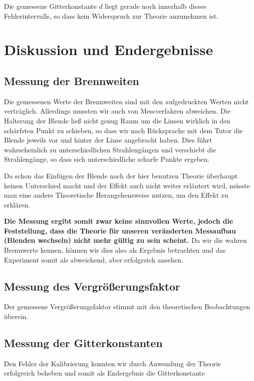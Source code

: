 \documentclass[a4paper,german,12pt,smallheadings]{scrartcl}
\begin{document}
Die gemessene Gitterkonstante $d$ liegt gerade noch innerhalb dieses
Fehlerintervalls, so dass kein Widerspruch zur Theorie anzunehmen ist.

\section{Diskussion und Endergebnisse}

\subsection{Messung der Brennweiten}

Die gemessenen Werte der Brennweiten sind mit den aufgedruckten Werten nicht
verträglich.  Allerdings mussten wir auch von Messverfahren abweichen. Die
Halterung der Blende ließ nicht genug Raum um die Linsen wirklich in den
schärfsten Punkt zu schieben, so dass wir nach Rücksprache mit dem Tutor die
Blende jeweils vor und hinter der Linse angebracht haben. Dies führt
wahrscheinlich zu unterschiedlichen Strahlengängen und verschiebt die
Strahlengänge, so dass sich unterschiedliche scharfe Punkte ergeben.

Da schon das Einfügen der Blende nach der hier benutzen Theorie überhaupt
keinen Unterschied macht und der Effekt auch nicht weiter erläutert wird,
müsste man eine andere Theoretische Herangehensweise nutzen, um den Effekt zu
erklären.

\textbf{Die Messung ergibt somit zwar keine sinnvollen Werte, jedoch die
Feststellung, dass die Theorie für unseren veränderten Messaufbau (Blenden
wechseln) nicht mehr gültig zu sein scheint.} Da wir die wahren Brennwerte
kennen, können wir dies also als Ergebnis betrachten und das Experiment somit
als abweichend, aber erfolgreich ansehen.

\subsection{Messung des Vergrößerungsfaktor}

Der gemessene Vergrößerungsfaktor stimmt mit den theoretischen Beobachtungen
überein.

\subsection{Messung der Gitterkonstanten}

Den Fehler der Kalibrierung konnten wir durch Anwendung der Theorie erfolgreich
beheben und somit als Endergebnis die Gitterkonstante
\end{document}
